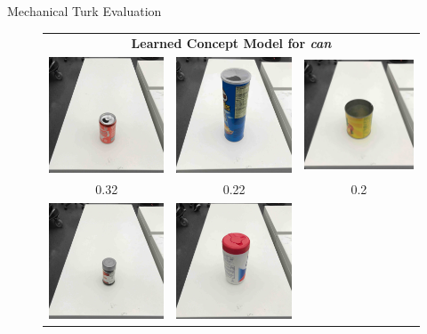 \documentclass[final]{beamer}
\newcommand{\setblocksize}{\Large \centering}
\begin{document}
\begin{frame}{}
\begin{columns}[t]
\begin{column}{0.24\linewidth}
\begin{block}{\setblocksize Mechanical Turk Evaluation}
{\begin{figure}
\centering
\begin{tabular}[t!]{ccc}
  \multicolumn{3}{c}{\bf Learned Concept Model for \emph{can}} \\
  \includegraphics[width=0.3\linewidth]{figures/oidx_26.jpg} &
  \includegraphics[width=0.3\linewidth]{figures/oidx_13.jpg} &
  \includegraphics[width=0.3\linewidth]{figures/oidx_11.jpg} \\
  0.32 & 0.22 & 0.2 \\
  \includegraphics[width=0.3\linewidth]{figures/oidx_25.jpg} &
  \includegraphics[width=0.3\linewidth]{figures/oidx_12.jpg} &

\end{tabular}
\end{figure}}
\end{block}
\end{column}
\end{columns}
\end{frame}
\end{document}
